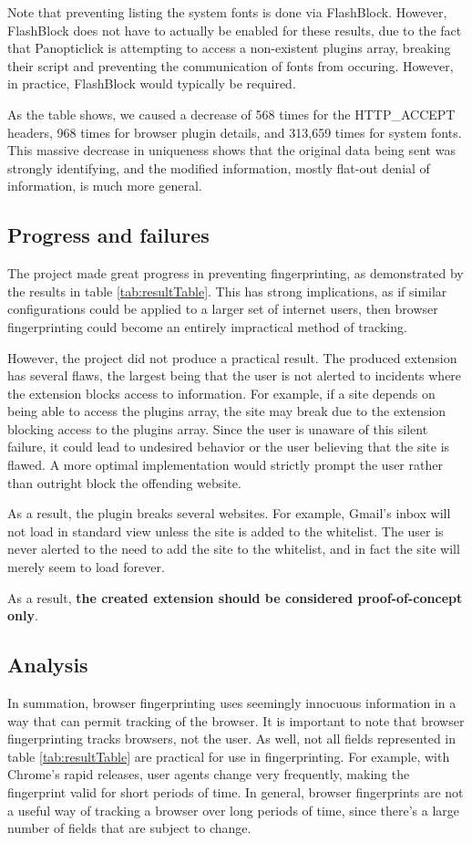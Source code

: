 \documentclass[12pt,a4paper]{article}
\begin{document}
Note that preventing listing the system fonts is done via FlashBlock. However, FlashBlock does not have to actually be enabled for these results, due to the fact that Panopticlick is attempting to access a non-existent plugins array, breaking their script and preventing the communication of fonts from occuring. However, in practice, FlashBlock would typically be required.

As the table shows, we caused a decrease of 568 times for the HTTP\_ACCEPT headers, 968 times for browser plugin details, and 313,659 times for system fonts. This massive decrease in uniqueness shows that the original data being sent was strongly identifying, and the modified information, mostly flat-out denial of information, is much more general.

\subsection{Progress and failures}
The project made great progress in preventing fingerprinting, as demonstrated by the results in table \ref{tab:resultTable}. This has strong implications, as if similar configurations could be applied to a larger set of internet users, then browser fingerprinting could become an entirely impractical method of tracking.

However, the project did not produce a practical result. The produced extension has several flaws, the largest being that the user is not alerted to incidents where the extension blocks access to information. For example, if a site depends on being able to access the plugins array, the site may break due to the extension blocking access to the plugins array. Since the user is unaware of this silent failure, it could lead to undesired behavior or the user believing that the site is flawed. A more optimal implementation would strictly prompt the user rather than outright block the offending website.

As a result, the plugin breaks several websites. For example, Gmail's inbox will not load in standard view unless the site is added to the whitelist. The user is never alerted to the need to add the site to the whitelist, and in fact the site will merely seem to load forever.

As a result, \textbf{the created extension should be considered proof-of-concept only}.

\subsection{Analysis}
In summation, browser fingerprinting uses seemingly innocuous information in a way that can permit tracking of the browser. It is important to note that browser fingerprinting tracks browsers, not the user. As well, not all fields represented in table \ref{tab:resultTable} are practical for use in fingerprinting. For example, with Chrome's rapid releases, user agents change very frequently, making the fingerprint valid for short periods of time. In general, browser fingerprints are not a useful way of tracking a browser over long periods of time, since there's a large number of fields that are subject to change.
\end{document}
